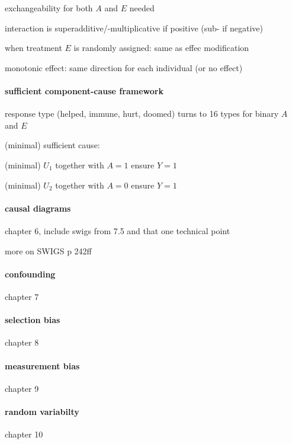 \documentclass[8pt]{extarticle}
\begin{document}
\begin{multicols}{2}
exchangeability for both $A$ and $E$ needed


interaction is superadditive/-multiplicative if positive (sub- if negative)

when treatment $E$ is randomly assigned: same as effec modification

monotonic effect: same direction for each individual (or no effect)


\paragraph{\large sufficient component-cause framework}

response type (helped, immune, hurt, doomed) turns to 16 types for binary $A$ and $E$

(minimal) sufficient cause: 

(minimal) $U_1$ together with $A=1$ ensure $Y=1$

(minimal) $U_2$ together with $A=0$ ensure $Y=1$




\paragraph{causal diagrams} chapter 6, include swigs from 7.5 and that one technical point

more on SWIGS p 242ff

\paragraph{confounding} chapter 7

\paragraph{selection bias} chapter 8

\paragraph{measurement bias} chapter 9

\paragraph{random variabilty} chapter 10



\end{multicols}



\end{document}
